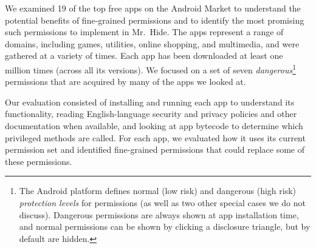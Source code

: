 \documentclass[preprint]{sig-alternate-10pt}
\newcommand{\lib}{Mr.\ Hide\xspace}
\newcommand{\comment}[3][\color{red}]{}%
\newcommand{\jeff}[1]{\comment[\color{green}]{JSF}{#1}}
\begin{document}
We examined 19 of the top free apps on the Android Market to understand the potential benefits of
fine-grained permissions and to identify the most promising such
permissions to implement in \lib.   
The apps represent a range of domains, including games, utilities,
online shopping, and multimedia, and were gathered at a variety of
times. Each app has been downloaded at least one million times (across
all its versions).
We focused on a set of seven
{\em dangerous}\footnote{The Android platform defines
  normal (low risk) and dangerous (high risk) \emph{protection levels}
  for permissions (as well as two other special cases we do not
  discuss).  Dangerous permissions are always shown at app
  installation time, and normal permissions can be shown by clicking a
  disclosure triangle, but by default are hidden.}
permissions that are acquired by many of the apps we looked at.

Our evaluation consisted of installing and running each app to
understand its functionality, reading English-language security and privacy
policies and other documentation when available, and looking at app
bytecode to  determine which privileged methods are called. %
For each app, we evaluated how it uses its current permission set and
identified fine-grained permissions that could replace some of these
permissions.
\end{document}
